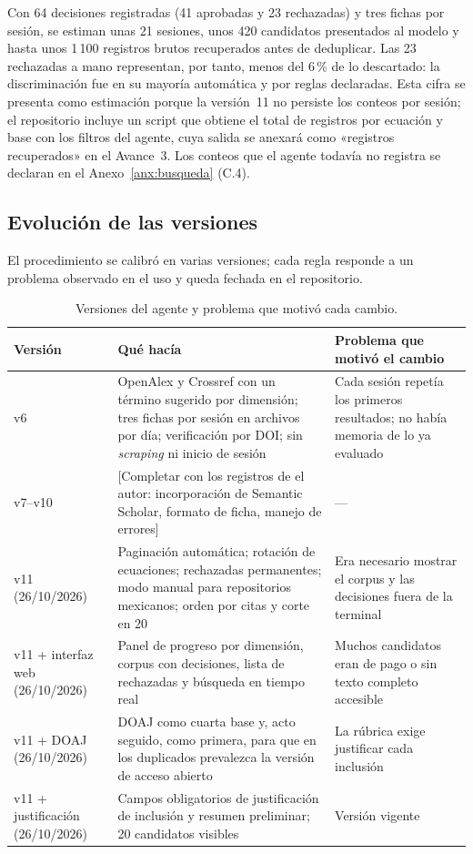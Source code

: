 \documentclass[letter,12pt]{article}
\begin{document}
Con 64 decisiones registradas (41 aprobadas y 23 rechazadas) y tres fichas por sesión, se estiman unas 21 sesiones, unos 420 candidatos presentados al modelo y hasta unos 1\,100 registros brutos recuperados antes de deduplicar. Las 23 rechazadas a mano representan, por tanto, menos del 6\,\% de lo descartado: la discriminación fue en su mayoría automática y por reglas declaradas. Esta cifra se presenta como estimación porque la versión~11 no persiste los conteos por sesión; el repositorio incluye un script que obtiene el total de registros por ecuación y base con los filtros del agente, cuya salida se anexará como «registros recuperados» en el Avance~3. Los conteos que el agente todavía no registra se declaran en el Anexo~\ref{anx:busqueda} (C.4).

\subsection{Evolución de las versiones}

El procedimiento se calibró en varias versiones; cada regla responde a un problema observado en el uso y queda fechada en el repositorio.

\begin{table}[H]
\centering
\footnotesize
\caption{Versiones del agente y problema que motivó cada cambio.}
\label{tab:versiones}
\renewcommand{\arraystretch}{1.35}
\begin{tabular}{|p{2.6cm}|p{5.2cm}|p{4.6cm}|}
\hline
\rowcolor{bgCotejo}
\textbf{Versión} & \textbf{Qué hacía} & \textbf{Problema que motivó el cambio} \\
\hline
v6 & OpenAlex y Crossref con un término sugerido por dimensión; tres fichas por sesión en archivos por día; verificación por DOI; sin \textit{scraping} ni inicio de sesión & Cada sesión repetía los primeros resultados; no había memoria de lo ya evaluado \\
\hline
v7--v10 & [Completar con los registros de el autor: incorporación de Semantic Scholar, formato de ficha, manejo de errores] & --- \\
\hline
v11 (26/10/2026) & Paginación automática; rotación de ecuaciones; rechazadas permanentes; modo manual para repositorios mexicanos; orden por citas y corte en 20 & Era necesario mostrar el corpus y las decisiones fuera de la terminal \\
\hline
v11 + interfaz web (26/10/2026) & Panel de progreso por dimensión, corpus con decisiones, lista de rechazadas y búsqueda en tiempo real & Muchos candidatos eran de pago o sin texto completo accesible \\
\hline
v11 + DOAJ (26/10/2026) & DOAJ como cuarta base y, acto seguido, como primera, para que en los duplicados prevalezca la versión de acceso abierto & La rúbrica exige justificar cada inclusión \\
\hline
v11 + justificación (26/10/2026) & Campos obligatorios de justificación de inclusión y resumen preliminar; 20 candidatos visibles & Versión vigente \\
\hline
\end{tabular}
\end{table}
\end{document}
